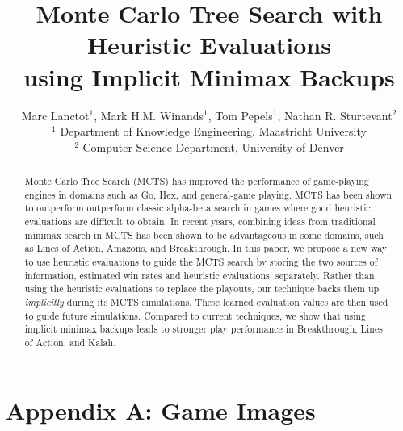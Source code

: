 \documentclass{article}
\title{Monte Carlo Tree Search with Heuristic Evaluations\\using Implicit Minimax Backups}
\author{Marc Lanctot$^1$, Mark H.M. Winands$^1$, Tom Pepels$^1$, Nathan R. Sturtevant$^2$ \\
\hspace{-1cm}$^1$ Department of Knowledge Engineering, Maastricht University\\
\hspace{-1cm}$^2$ Computer Science Department, University of Denver\\}
\date{}
\begin{document}
 


\maketitle
\allowdisplaybreaks

\begin{abstract} 
Monte Carlo Tree Search (MCTS) has improved the performance of game-playing engines in 
domains such as Go, Hex, and general-game playing. MCTS has been shown to outperform
outperform classic alpha-beta search in games where good heuristic evaluations are difficult to obtain. 
In recent years, combining ideas from traditional minimax search in MCTS has been shown to be advantageous in some domains, 
such as Lines of Action, Amazons, and Breakthrough.
In this paper, we propose 
a new way to use heuristic evaluations to guide the MCTS search by storing the two sources of 
information, estimated win rates and heuristic evaluations, separately. 
Rather than using the heuristic evaluations to replace the playouts, 
our technique backs them up {\it implicitly} during its MCTS simulations. 
These learned evaluation values are then used to guide future simulations. 
Compared to current techniques, we show that using implicit minimax backups  
leads to stronger play performance in Breakthrough, Lines of Action, and Kalah. 
\end{abstract} 

%
%

%
%





\appendix

\section{Appendix A: Game Images}
\end{document}
